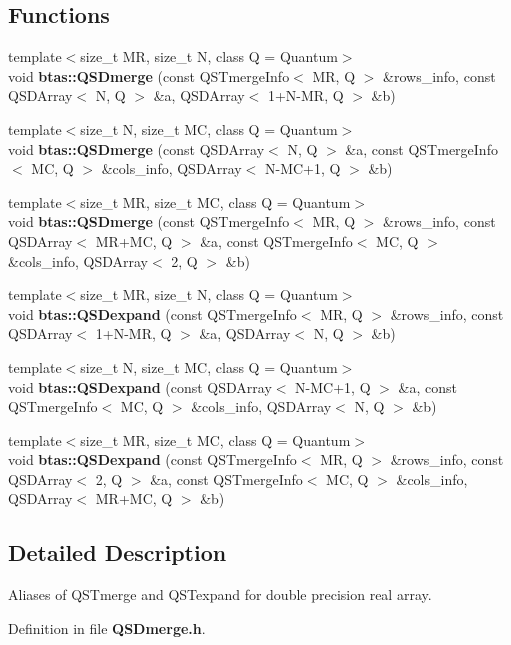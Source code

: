 \subsection*{Functions}
\begin{DoxyCompactItemize}
\item 
{\footnotesize template$<$size\-\_\-t M\-R, size\-\_\-t N, class Q  = Quantum$>$ }\\void {\bf btas\-::\-Q\-S\-Dmerge} (const Q\-S\-Tmerge\-Info$<$ M\-R, Q $>$ \&rows\-\_\-info, const Q\-S\-D\-Array$<$ N, Q $>$ \&a, Q\-S\-D\-Array$<$ 1+N-\/M\-R, Q $>$ \&b)
\item 
{\footnotesize template$<$size\-\_\-t N, size\-\_\-t M\-C, class Q  = Quantum$>$ }\\void {\bf btas\-::\-Q\-S\-Dmerge} (const Q\-S\-D\-Array$<$ N, Q $>$ \&a, const Q\-S\-Tmerge\-Info$<$ M\-C, Q $>$ \&cols\-\_\-info, Q\-S\-D\-Array$<$ N-\/M\-C+1, Q $>$ \&b)
\item 
{\footnotesize template$<$size\-\_\-t M\-R, size\-\_\-t M\-C, class Q  = Quantum$>$ }\\void {\bf btas\-::\-Q\-S\-Dmerge} (const Q\-S\-Tmerge\-Info$<$ M\-R, Q $>$ \&rows\-\_\-info, const Q\-S\-D\-Array$<$ M\-R+M\-C, Q $>$ \&a, const Q\-S\-Tmerge\-Info$<$ M\-C, Q $>$ \&cols\-\_\-info, Q\-S\-D\-Array$<$ 2, Q $>$ \&b)
\item 
{\footnotesize template$<$size\-\_\-t M\-R, size\-\_\-t N, class Q  = Quantum$>$ }\\void {\bf btas\-::\-Q\-S\-Dexpand} (const Q\-S\-Tmerge\-Info$<$ M\-R, Q $>$ \&rows\-\_\-info, const Q\-S\-D\-Array$<$ 1+N-\/M\-R, Q $>$ \&a, Q\-S\-D\-Array$<$ N, Q $>$ \&b)
\item 
{\footnotesize template$<$size\-\_\-t N, size\-\_\-t M\-C, class Q  = Quantum$>$ }\\void {\bf btas\-::\-Q\-S\-Dexpand} (const Q\-S\-D\-Array$<$ N-\/M\-C+1, Q $>$ \&a, const Q\-S\-Tmerge\-Info$<$ M\-C, Q $>$ \&cols\-\_\-info, Q\-S\-D\-Array$<$ N, Q $>$ \&b)
\item 
{\footnotesize template$<$size\-\_\-t M\-R, size\-\_\-t M\-C, class Q  = Quantum$>$ }\\void {\bf btas\-::\-Q\-S\-Dexpand} (const Q\-S\-Tmerge\-Info$<$ M\-R, Q $>$ \&rows\-\_\-info, const Q\-S\-D\-Array$<$ 2, Q $>$ \&a, const Q\-S\-Tmerge\-Info$<$ M\-C, Q $>$ \&cols\-\_\-info, Q\-S\-D\-Array$<$ M\-R+M\-C, Q $>$ \&b)
\end{DoxyCompactItemize}


\subsection{Detailed Description}
Aliases of Q\-S\-Tmerge and Q\-S\-Texpand for double precision real array. 

Definition in file {\bf Q\-S\-Dmerge.\-h}.

